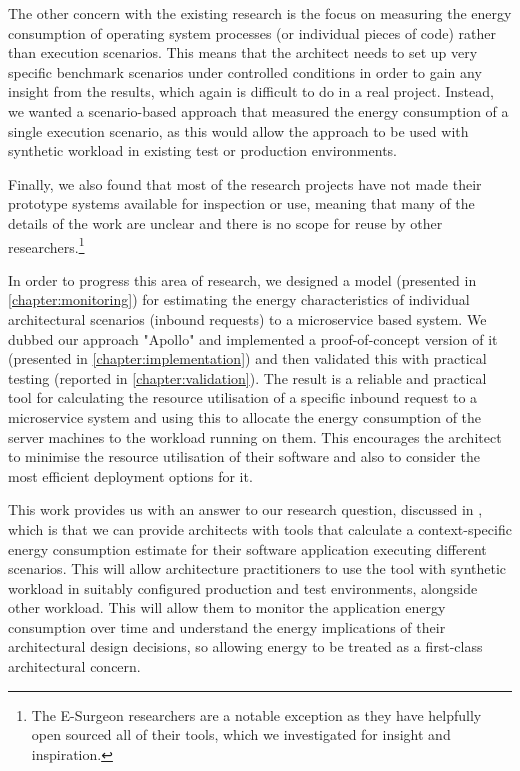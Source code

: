 The other concern with the existing research is the focus on measuring the energy consumption of operating system processes (or individual pieces of code) rather than execution scenarios.  This means that the architect needs to set up very specific benchmark scenarios under controlled conditions in order to gain any insight from the results, which again is difficult to do in a real project.  Instead, we wanted a scenario-based approach that measured the energy consumption of a single execution scenario, as this would allow the approach to be used with synthetic workload in existing test or production environments.  

Finally, we also found that most of the research projects have not made their prototype systems available for inspection or use, meaning that many of the details of the work are unclear and there is no scope for reuse by other researchers.\footnote{The E-Surgeon researchers \cite{noureddine2015-hotspots} are a notable exception as they have helpfully open sourced all of their tools, which we investigated for insight and inspiration.}

In order to progress this area of research, we designed a model (presented in \cref{chapter:monitoring}) for estimating the energy characteristics of individual architectural scenarios (inbound requests) to a microservice based system.  We dubbed our approach "Apollo" and implemented a proof-of-concept version of it (presented in \cref{chapter:implementation}) and then validated this with practical testing (reported in \cref{chapter:validation}).  The result is a reliable and practical tool for calculating the resource utilisation of a specific inbound request to a microservice system and using this to allocate the energy consumption of the server machines to the workload running on them. This encourages the architect to minimise the resource utilisation of their software and also to consider the most efficient deployment options for it.

This work provides us with an answer to our research question, discussed in , which is that we can provide architects with tools that calculate a context-specific energy consumption estimate for their software application executing different scenarios.  This will allow architecture practitioners to use the tool with synthetic workload in suitably configured production and test environments, alongside other workload.  This will allow them to monitor the application energy consumption over time and understand the energy implications of their architectural design decisions, so allowing energy to be treated as a first-class architectural concern.

